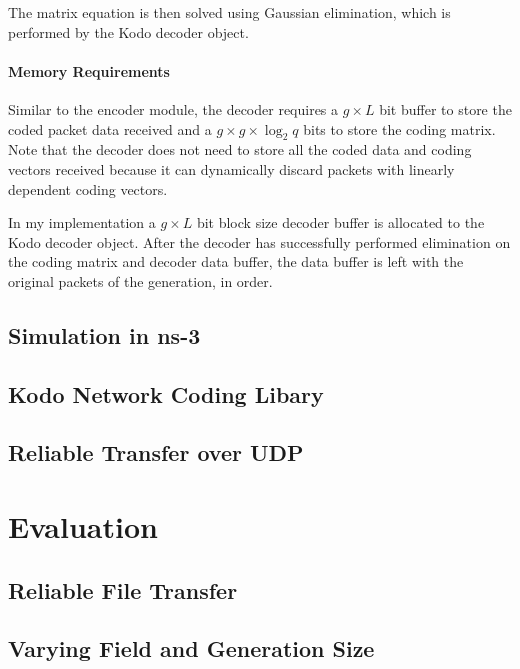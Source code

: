 \documentclass[12pt,a4paper,twoside,openright]{report}
\begin{document}
The matrix equation is then solved using Gaussian elimination, which is performed by the Kodo decoder object.

\subsubsection{Memory Requirements}

Similar to the encoder module, the decoder requires a $g \times L$ bit buffer to store the coded packet data received and a $g \times g \times \log_2 q$ bits to store the coding matrix. Note that the decoder does not need to store all the coded data and coding vectors received because it can dynamically discard packets with linearly dependent coding vectors. 

In my implementation a $g \times L$ bit block size decoder buffer is allocated to the Kodo decoder object. After the decoder has successfully performed elimination on the coding matrix and decoder data buffer, the data buffer is left with the original packets of the generation, in order.

\section{Simulation in ns-3} \label{sec:ns3}

\section{Kodo Network Coding Libary} \label{sec:kodo}

\section{Reliable Transfer over UDP}

\chapter{Evaluation} \label{ch:eval}

\section{Reliable File Transfer} \label{sec:relUDP}

\section{Varying Field and Generation Size} \label{sec:fieldgen}
\end{document}
